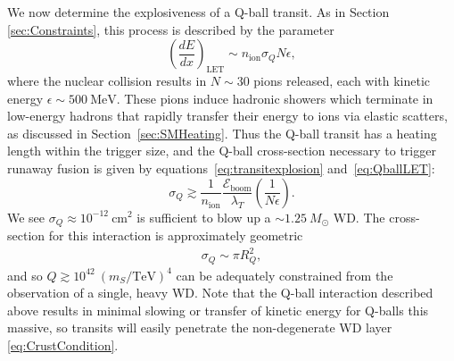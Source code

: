 \documentclass[twocolumn, preprintnumbers,amsmath,amssymb,prd, superscriptaddress]{revtex4}
\newcommand{\Eboom}{\mathcal{E}_\text{boom}}
\def\r{\right)}
\def\l{\left(}
\begin{document}
We now determine the explosiveness of a Q-ball transit.
As in Section \ref{sec:Constraints}, this process is described by the parameter
\begin{equation}
\label{eq:QballLET}
\l\frac{dE}{dx}\r_\text{LET} \sim n_\text{ion} \sigma_Q N \epsilon,
\end{equation}
where the nuclear collision results in $N \sim 30$ pions released, each with kinetic energy $\epsilon \sim 500 ~\text{MeV}$.
These pions induce hadronic showers which terminate in low-energy hadrons that rapidly transfer their energy to ions via elastic scatters, as discussed in Section~\ref{sec:SMHeating}.
Thus the Q-ball transit has a heating length within the trigger size, and the Q-ball cross-section necessary to trigger runaway fusion is given by equations~\eqref{eq:transitexplosion} and~\eqref{eq:QballLET}:
\begin{equation}
\sigma_Q \gtrsim \frac{1}{n_\text{ion}} \frac{\Eboom}{\lambda_T} \l \frac{1}{N \epsilon} \r.
\end{equation}
We see $\sigma_Q \approx 10^{-12} ~\text{cm}^2$ is sufficient to blow up a $\sim 1.25 ~M_{\odot}$ WD.
The cross-section for this interaction is approximately geometric
\begin{align}
\sigma_Q \sim \pi R_Q^2,
\end{align}
and so $Q \gtrsim 10^{42} ~(m_S/\text{TeV})^4$ can be adequately constrained from the observation of a single, heavy WD.
Note that the Q-ball interaction described above results in minimal slowing or transfer of kinetic energy for Q-balls this massive, so transits will easily penetrate the non-degenerate WD layer \eqref{eq:CrustCondition}.
\end{document}
